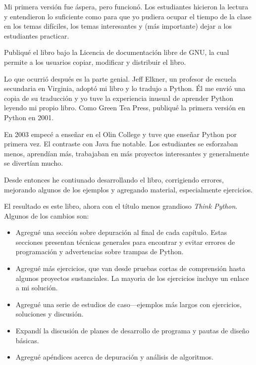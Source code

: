 \documentclass[10pt]{book}
\begin{document}
Mi primera versión fue áspera, pero funcionó.  Los estudiantes hicieron la
lectura y entendieron lo suficiente como para que yo pudiera ocupar el tiempo
de la clase en los temas difíciles, los temas interesantes y (más importante)
dejar a los estudiantes practicar.

Publiqué el libro bajo la Licencia de documentación libre de GNU,
la cual permite a los usuarios copiar, modificar y distribuir el libro.

Lo que ocurrió después es la parte genial.  Jeff Elkner, un profesor
de escuela secundaria en Virginia, adoptó mi libro y lo tradujo a Python.
Él me envió una copia de su traducción y yo tuve la experiencia inusual de
aprender Python leyendo mi propio libro. Como Green Tea Press,
publiqué la primera versión en Python en 2001.

En 2003 empecé a enseñar en el Olin College y tuve que enseñar Python
por primera vez.  El contraste con Java fue notable.
Los estudiantes se esforzaban menos, aprendían más, trabajaban en más
proyectos interesantes y generalmente se divertían mucho.

Desde entonces he contiunado desarrollando el libro,
corrigiendo errores, mejorando algunos de los ejemplos y agregando material,
especialmente ejercicios.

El resultado es este libro, ahora con el título menos grandioso
{\em Think Python}.  Algunos de los cambios son:

\begin{itemize}

\item Agregué una sección sobre depuración al final de cada capítulo.
  Estas secciones presentan técnicas generales para encontrar y evitar
  errores de programación y advertencias sobre trampas de Python.

\item Agregué más ejercicios, que van desde pruebas cortas de comprensión
  hasta algunos proyectos sustanciales.  La mayoria de los ejercicios
  incluye un enlace a mi solución.

\item Agregué una serie de estudios de caso---ejemplos más largos con
  ejercicios, soluciones y discusión.

\item Expandí la discusión de planes de desarrollo de programa y
  pautas de diseño básicas.

\item Agregué apéndices acerca de depuración y análisis de algoritmos.

\end{itemize}
\end{document}
